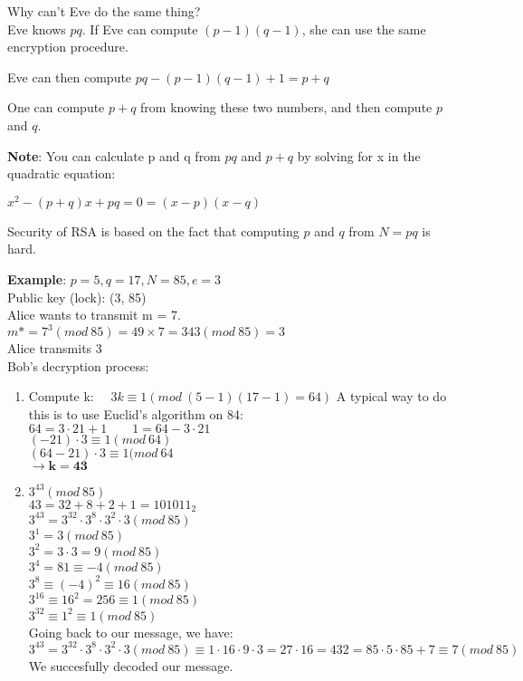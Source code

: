 \documentclass[9pt, letterpaper, oneside]{article}
\begin{document}
Why can't Eve do the same thing?\\
Eve knows $pq$. If Eve can compute $(p-1)(q-1)$, she can use the same encryption procedure.

Eve can then compute $pq - (p-1)(q-1) + 1 = p + q$

One can compute $p + q$ from knowing these two numbers, and then compute $p$ and $q$.

\textbf{Note}: You can calculate p and q from $pq$ and $p + q$ by solving for x in the quadratic equation:

$x^2 - (p+q)x + pq = 0 = (x - p)(x- q)$

Security of RSA is based on the fact that computing $p$ and $q$ from $N = pq$ is hard.


\textbf{Example}: 
$p = 5, q = 17, N = 85, e = 3$\\
Public key (lock): (3, 85)\\
Alice wants to transmit m = 7.\\
$m* = 7^3 (mod \ 85) = 49 \times 7 = 343 (mod \ 85) = 3$\\
Alice transmits 3\\
Bob's decryption process:\\
\begin{enumerate}
\item Compute k: $\quad 3k \equiv 1 (mod \ (5 - 1)(17 - 1) = 64)$
A typical way to do this is to use Euclid's algorithm on 84:\\
$64 = 3 \cdot 21 + 1 \qquad 1 = 64 - 3 \cdot 21$\\
$(-21) \cdot 3 \equiv 1 (mod \ 64)$\\
$(64 - 21) \cdot 3 \equiv 1 (mod \ 64$\\
$\to \mathbf{k = 43}$
\item $3^{43} (mod \ 85)$\\
$43 = 32 + 8 + 2 + 1 = 101011_2$\\
$3^{43} = 3^{32} \cdot 3^8 \cdot 3^2 \cdot 3 (mod \ 85) $\\
$3^1 = 3 (mod \ 85)$\\
$3^2 = 3 \cdot 3 =  9 (mod \ 85)$\\
$3^4 = 81 \equiv -4 (mod \ 85)$\\
$3^8 \equiv (-4)^2 \equiv 16 (mod \ 85)$\\
$3^{16} \equiv 16^2 = 256 \equiv 1 (mod \ 85)$\\
$3^{32} \equiv 1^2 \equiv 1 (mod \ 85)$\\
Going back to our message, we have:\\
$3^{43} = 3^{32} \cdot 3^8 \cdot 3^2 \cdot 3 (mod \ 85) \equiv 1 \cdot 16 \cdot 9 \cdot 3 = 27 \cdot 16 = 432 = 85 \cdot 5 \cdot 85 + 7 \equiv 7 (mod \ 85)$\\
We succesfully decoded our message.
\end{enumerate}
\end{document}
